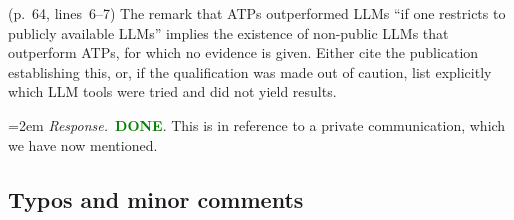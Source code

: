 \documentclass[11pt]{amsart}
\newcommand{\done}{\textcolor{green}{\textbf{DONE}}}
\newcommand{\response}[1]{%
  \par\smallskip
  \noindent\hangindent=2em\hangafter=1
  \textit{Response.}\ #1
  \par\smallskip}
\begin{document}
\begin{requests}
\item (p.~64, lines~6--7) The remark that ATPs outperformed LLMs ``if one restricts to
publicly available LLMs'' implies the existence of non-public LLMs that outperform
ATPs, for which no evidence is given. Either cite the publication establishing this, or,
if the qualification was made out of caution, list explicitly which LLM tools were tried
and did not yield results.
\response{\done. This is in reference to a private communication, which we have now mentioned.}

\end{requests}

\subsection*{Typos and minor comments}
\end{document}
